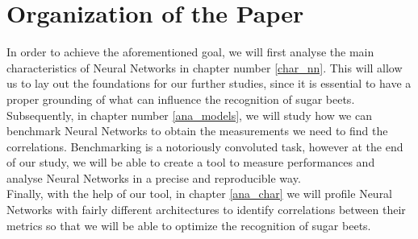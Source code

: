 \section{Organization of the Paper}
In order to achieve the aforementioned goal, we will first analyse the main characteristics of Neural Networks in chapter number \ref{char_nn}. This will allow us to lay out the foundations for our further studies, since it is essential to have a proper grounding of what can influence the recognition of sugar beets.\\
Subsequently, in chapter number \ref{ana_models}, we will study how we can benchmark Neural Networks to obtain the measurements we need to find the correlations. Benchmarking is a notoriously convoluted task, however at the end of our study, we will be able to create a tool to measure performances and analyse Neural Networks in a precise and reproducible way.\\
Finally, with the help of our tool, in chapter \ref{ana_char} we will profile Neural Networks with fairly different architectures to identify correlations between their metrics so that we will be able to optimize the recognition of sugar beets. 
